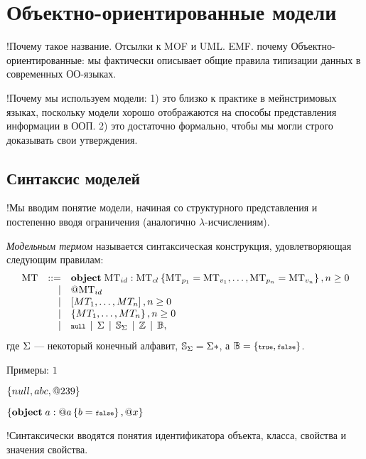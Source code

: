 \chapter{Объектно-ориентированные модели}

!Почему такое название. Отсылки к MOF и UML. EMF. 
почему Объектно-ориентированные: мы фактически описывает общие правила типизации данных в современных ОО-языках.

!Почему мы используем модели: 
1) это близко к практике в мейнстримовых языках, поскольку модели хорошо отображаются на способы представления информации в ООП. 
2) это достаточно формально, чтобы мы могли строго доказывать свои утверждения.

\section{Синтаксис моделей}

!Мы вводим понятие модели, начиная со структурного представления и постепенно вводя ограничения (аналогично $\lambda$-исчислениям).

\begin{Def}
\emph{Модельным термом} называется синтаксическая конструкция, удовлетворяющая следующим правилам:
\[
\begin{array}{rrl}
	\mbox{MT} & ::= & \mathbf{object}\;\mbox{MT}_{id} : \mbox{MT}_{cl} \left\{ \mbox{MT}_{p_1}=\mbox{MT}_{v_1},\ldots,\mbox{MT}_{p_n}=\mbox{MT}_{v_n} \right\}, n \ge 0 \\ 
	           &   | & @\mbox{MT}_{id} \\ 
	           &   | & \left[MT_1,\ldots,MT_n\right], n \ge 0 \\ 
	           &   | & \left\{MT_1,\ldots,MT_n\right\}, n \ge 0 \\ 
	           &   | & \mbox{\scriptsize \tt null} \;\,|\;\,  \Sigma \;\,|\;\, \mathbb{S}_\Sigma \;\,|\;\, \mathbb{Z} \;\,|\;\, \mathbb{B}, \\
\end{array}
\]
где $\Sigma$ --- некоторый конечный алфавит, \mbox{$\mathbb{S}_\Sigma = \Sigma*$}, а $\mathbb{B} = \left\{ \mbox{\scriptsize \tt true}, \mbox{\scriptsize \tt false} \right\}$.
\end{Def}

Примеры:
$1$

$\left\{null, abc, @239\right\}$

$\left\{\mathbf{object}\;a : @a \left\{ b=\mbox{\scriptsize \tt false} \right\}, @x\right\}$

!Синтаксически вводятся понятия идентификатора объекта, класса, свойства и значения свойства.

